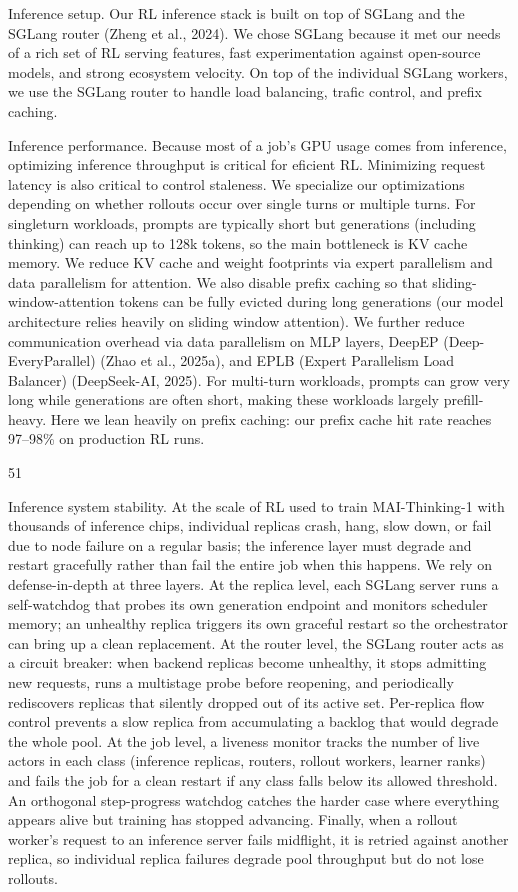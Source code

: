 \documentclass[
  10
]{article}
\begin{document}
Inference setup. Our RL inference stack is built on top of SGLang and
the SGLang router (Zheng et al., 2024). We chose SGLang because it met
our needs of a rich set of RL serving features, fast experimentation
against open-source models, and strong ecosystem velocity. On top of the
individual SGLang workers, we use the SGLang router to handle load
balancing, trafic control, and prefix caching.

Inference performance. Because most of a job's GPU usage comes from
inference, optimizing inference throughput is critical for eficient RL.
Minimizing request latency is also critical to control staleness. We
specialize our optimizations depending on whether rollouts occur over
single turns or multiple turns. For singleturn workloads, prompts are
typically short but generations (including thinking) can reach up to
128k tokens, so the main bottleneck is KV cache memory. We reduce KV
cache and weight footprints via expert parallelism and data parallelism
for attention. We also disable prefix caching so that
sliding-window-attention tokens can be fully evicted during long
generations (our model architecture relies heavily on sliding window
attention). We further reduce communication overhead via data
parallelism on MLP layers, DeepEP (Deep-EveryParallel) (Zhao et al.,
2025a), and EPLB (Expert Parallelism Load Balancer) (DeepSeek-AI, 2025).
For multi-turn workloads, prompts can grow very long while generations
are often short, making these workloads largely prefill-heavy. Here we
lean heavily on prefix caching: our prefix cache hit rate reaches
97--98\% on production RL runs.

51

Inference system stability. At the scale of RL used to train
MAI-Thinking-1 with thousands of inference chips, individual replicas
crash, hang, slow down, or fail due to node failure on a regular basis;
the inference layer must degrade and restart gracefully rather than fail
the entire job when this happens. We rely on defense-in-depth at three
layers. At the replica level, each SGLang server runs a self-watchdog
that probes its own generation endpoint and monitors scheduler memory;
an unhealthy replica triggers its own graceful restart so the
orchestrator can bring up a clean replacement. At the router level, the
SGLang router acts as a circuit breaker: when backend replicas become
unhealthy, it stops admitting new requests, runs a multistage probe
before reopening, and periodically rediscovers replicas that silently
dropped out of its active set. Per-replica flow control prevents a slow
replica from accumulating a backlog that would degrade the whole pool.
At the job level, a liveness monitor tracks the number of live actors in
each class (inference replicas, routers, rollout workers, learner ranks)
and fails the job for a clean restart if any class falls below its
allowed threshold. An orthogonal step-progress watchdog catches the
harder case where everything appears alive but training has stopped
advancing. Finally, when a rollout worker's request to an inference
server fails midflight, it is retried against another replica, so
individual replica failures degrade pool throughput but do not lose
rollouts.
\end{document}
